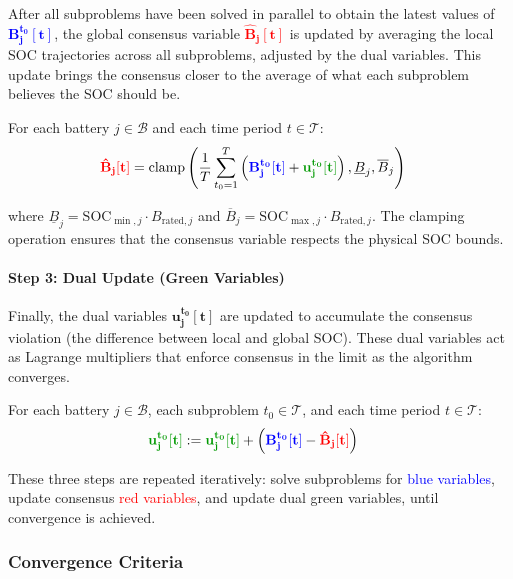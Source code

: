 After all subproblems have been solved in parallel to obtain the latest values of \textcolor{blue}{$\mathbf{B_j^{t_0}[t]}$}, the global consensus variable \textcolor{red}{$\mathbf{\hat{B}_j[t]}$} is updated by averaging the local SOC trajectories across all subproblems, adjusted by the dual variables. This update brings the consensus closer to the average of what each subproblem believes the SOC should be.

For each battery $j \in \mathcal{B}$ and each time period $t \in \mathcal{T}$:
\begin{align}
\textcolor{red}{\mathbf{\hat{B}_j[t]}} &= \text{clamp}\left( \frac{1}{T} \sum_{t_0=1}^{T} \left( \textcolor{blue}{\mathbf{B_j^{t_0}[t]}} + \textcolor{green!60!black}{\mathbf{u_j^{t_0}[t]}} \right), \underline{B}_j, \overline{B}_j \right)
\end{align}

where $\underline{B}_j = \text{SOC}_{\min,j} \cdot B_{\text{rated},j}$ and $\overline{B}_j = \text{SOC}_{\max,j} \cdot B_{\text{rated},j}$. The clamping operation ensures that the consensus variable respects the physical SOC bounds.

\paragraph{Step 3: Dual Update (Green Variables)}

Finally, the dual variables \textcolor{green!60!black}{$\mathbf{u_j^{t_0}[t]}$} are updated to accumulate the consensus violation (the difference between local and global SOC). These dual variables act as Lagrange multipliers that enforce consensus in the limit as the algorithm converges.

For each battery $j \in \mathcal{B}$, each subproblem $t_0 \in \mathcal{T}$, and each time period $t \in \mathcal{T}$:
\begin{align}
\textcolor{green!60!black}{\mathbf{u_j^{t_0}[t]}} &:= \textcolor{green!60!black}{\mathbf{u_j^{t_0}[t]}} + \left( \textcolor{blue}{\mathbf{B_j^{t_0}[t]}} - \textcolor{red}{\mathbf{\hat{B}_j[t]}} \right)
\end{align}

These three steps are repeated iteratively: solve subproblems for \textcolor{blue}{blue variables}, update consensus \textcolor{red}{red variables}, and update dual \textcolor{green!60!black}{green variables}, until convergence is achieved.

\subsubsection{Convergence Criteria}

